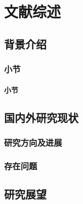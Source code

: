 \cleardoublepage
\newrefsection
\chapter{文献综述}

\section{背景介绍}

\subsection{小节}

\subsubsection{小节}

\section{国内外研究现状}

\subsection{研究方向及进展}

\subsection{存在问题}

\section{研究展望}

\newpage
\begingroup
    \printbibliography[title={参考文献}]
\endgroup
